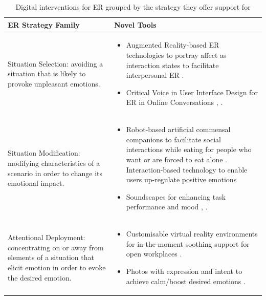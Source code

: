 \documentclass[acmtog]{acmart}
\begin{document}
\begin{table}[htbp]
\centering
\caption{Digital interventions for ER grouped by the strategy they offer support for}
\label{tab:my-table}
\begin{tabular}{m{6cm}m{10cm}}
\hline
\textbf{ER Strategy Family}                                                                                                             & \textbf{Novel Tools}                                                                                                                                                                                                                                                       \\ \hline
Situation Selection: avoiding a situation that is likely to provoke unpleasant emotions.                                                 & \begin{itemize}
\item Augmented Reality-based ER technologies to portray affect as interaction states to facilitate interpersonal ER \cite{semertzidis2020neo}.
\item Critical Voice in User Interface Design for ER in Online Conversations \cite{kiskola2021applying}, \cite{kou2020emotion}.
\end{itemize}                             \\ \hline
Situation Modification: modifying characteristics of a scenario in order to change its emotional impact.                                 & \begin{itemize}
\item Robot-based artificial commensal companions to facilitate social interactions while eating for people who want or are forced to eat alone \cite{mancini2020room}. Interaction-based technology to enable users up-regulate positive emotions \cite{li2020purpal}
\item Soundscapes for enhancing task performance and mood \cite{newbold2017using}, \cite{yu2018delight}.
\end{itemize}                 \\ \hline
Attentional Deployment: concentrating on or away from elements of a situation that elicit emotion in order to evoke the desired emotion. & \begin{itemize}
\item Customisable virtual reality environments for in-the-moment soothing support for open workplaces \cite{ruvimova2020transport}.
\item Photos with expression and intent to achieve calm/boost desired emotions \cite{chen2016promoting}.

\end{itemize}
\end{tabular}
\end{table}
\end{document}
